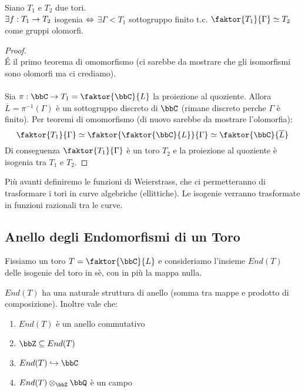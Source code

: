 \begin{proposizione}
Siano $T_{1}$ e $T_{2}$ due tori.\\
$\exists f:T_{1} \rightarrow T_{2}$ isogenia $\Leftrightarrow$ $\exists \Gamma < T_{1}$ sottogruppo finito t.c. $\faktor{T_{1}}{\Gamma} \simeq T_{2}$ come gruppi olomorfi. 
\end{proposizione}
\begin{proof}
\fbox{$\Rar$}\\
\'E il primo teorema di omomorfismo (ci sarebbe da mostrare che gli isomorfismi sono olomorfi ma ci crediamo).\\
\fbox{$\Leftarrow$}\\
Sia $\pi:\bbC \rar T_{1} = \faktor{\bbC}{L}$ la proiezione al quoziente. Allora $\overline{L}=\pi^{-1}(\Gamma)$ è un sottogruppo discreto di $\bbC$ (rimane discreto perche $\Gamma$ è finito). Per teoremi di omomorfismo (di nuovo sarebbe da mostrare l'olomorfia):
$$\faktor{T_{1}}{\Gamma} \simeq \faktor{\faktor{\bbC}{L}}{\Gamma} \simeq \faktor{\bbC}{\overline{L}}$$
Di conseguenza $\faktor{T_{1}}{\Gamma}$ è un toro $T_{2}$ e la proiezione al quoziente è isogenia tra $T_{1}$ e $T_{2}$.
\end{proof}

Più avanti definiremo le funzioni di Weierstrass, che ci permetteranno di trasformare i tori in curve algebriche (ellittiche). Le isogenie verranno trasformate in funzioni razionali tra le curve.

\subsection{Anello degli Endomorfismi di un Toro}

Fissiamo un toro $T=\faktor{\bbC}{L}$ e consideriamo l'insieme $End(T)$ delle isogenie del toro in sè, con in più la mappa nulla.

\begin{proposizione} $End(T)$ ha una naturale struttura di anello (somma tra mappe e prodotto di composizione). Inoltre vale che:
\begin{enumerate}
\item $End(T)$ è un anello commutativo
\item $\bbZ \subseteq End(T)$
\item $End(T) \hookrightarrow \bbC$
\item $End(T) \otimes_{\bbZ} \bbQ$ è un campo
\end{enumerate}
\end{proposizione}

